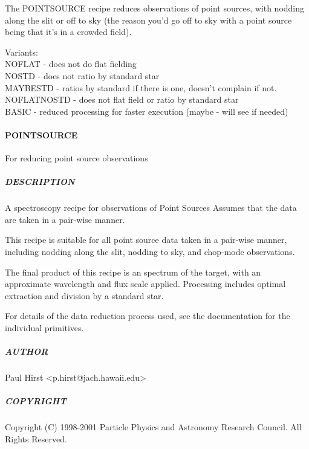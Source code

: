 \documentclass[twoside,11pt]{article}
\renewcommand{\_}{\texttt{\symbol{95}}}
\begin{document}
The POINT\_SOURCE recipe reduces observations of point sources, with
nodding along the slit or off to sky (the reason you'd go off to sky
with a point source being that it's in a crowded field).


Variants: \\
\_NOFLAT - does not do flat fielding \\
\_NOSTD - does not ratio by standard star \\
\_MAYBESTD - ratios by standard if there is one, doesn't complain if not. \\
\_NOFLAT\_NOSTD - does not flat field or ratio by standard star \\
\_BASIC - reduced processing for faster execution (maybe - will see if needed) \\

\paragraph*{POINT\_SOURCE\label{POINT_SOURCE}}

For reducing point source observations

\subparagraph*{DESCRIPTION\label{POINT_SOURCE_DESCRIPTION}}

A spectroscopy recipe for observations of Point Sources
Assumes that the data are taken in a pair-wise manner.



This recipe is suitable for all point source data taken in a pair-wise
manner, including nodding along the slit, nodding to sky, and
chop-mode observations.



The final product of this recipe is an spectrum of the target, with an
approximate wavelength and flux scale applied. Processing includes
optimal extraction and division by a standard star.



For details of the data reduction process used, see the documentation
for the individual primitives.

\subparagraph*{AUTHOR\label{POINT_SOURCE_AUTHOR}}

Paul Hirst <p.hirst@jach.hawaii.edu>

\subparagraph*{COPYRIGHT\label{POINT_SOURCE_COPYRIGHT}}

Copyright (C) 1998-2001 Particle Physics and Astronomy Research
Council. All Rights Reserved.
\end{document}
